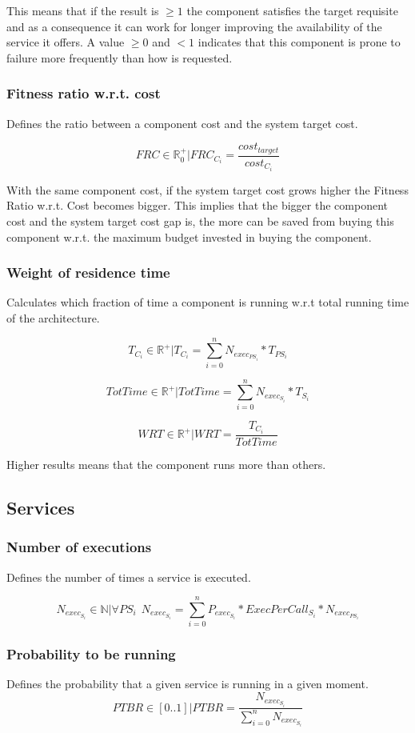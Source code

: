 This means that if the result is $\ge 1$ the component satisfies the target requisite and as a consequence it can work for longer improving the availability of the service it offers. A value $\ge 0 $ and $<1$ indicates that this component is prone to failure more frequently than how is requested.

\subsubsection{Fitness ratio w.r.t. cost}
Defines the ratio between a component cost and the system target cost. 

\[ FRC \in  \mathbb{R}^+_0 | FRC_{C_i} = \frac{cost_{target}}{cost_{C_i}}\]

With the same component cost, if the system target cost grows higher the Fitness Ratio w.r.t. Cost becomes bigger. This implies that the bigger the component cost and the system target cost gap is, the more can be saved from buying this component w.r.t. the maximum budget invested in buying the component.

\subsubsection{Weight of residence time}
Calculates which fraction of time a component is running w.r.t total running time of the architecture.

\[ T_{C_i} \in \mathbb{R}^+ | T_{C_i} = \sum_{i=0}^{n} N_{exec_{PS_i}} * T_{PS_i} \]

\[ TotTime \in \mathbb{R^+} | TotTime = \sum_{i=0}^{n}N_{exec_{S_i}} * T_{S_i} \]

\[ WRT \in \mathbb{R}^+ | WRT = \frac{T_{C_i}}{TotTime} \]

Higher results means that the component runs more than others.

\subsection{Services}
\subsubsection{Number of executions}
Defines the number of times a service is executed.

\[ N_{exec_{S_i}} \in \mathbb{N} | \forall PS_i \;\, N_{exec_{S_i}} = \sum_{i=0}^{n} P_{exec_{S_i}} * ExecPerCall_{S_i} * N_{exec_{PS_i}} \]

\subsubsection{Probability to be running}
Defines the probability that a given service is running in a given moment.
\[ PTBR \in [0..1] | PTBR =  \frac{{N_{exec_{S_i}}}}{ \sum_{i=0}^{n}  N_{exec_{S_i}}} \]

